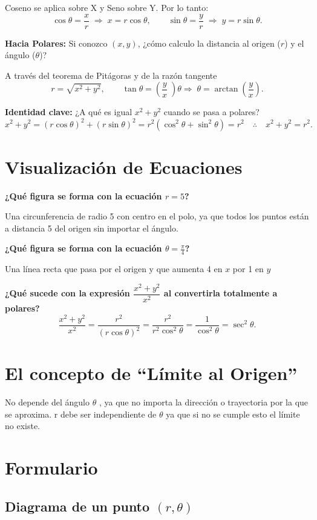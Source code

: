 \documentclass[50pt]{article}
\begin{document}
Coseno se aplica sobre X y Seno sobre Y. Por lo tanto:
\[
\cos\theta=\frac{x}{r}\;\Rightarrow\; x=r\cos\theta,
\qquad
\sin\theta=\frac{y}{r}\;\Rightarrow\; y=r\sin\theta .
\]
 
\textbf{Hacia Polares:} Si conozco $(x,y)$, ¿cómo calculo la distancia al origen ($r$) y el ángulo ($\theta$)?
 
A través del teorema de Pitágoras y de la razón tangente
\[
r=\sqrt{x^2+y^2},
\qquad
\tan\theta=(\frac{y}{x}\;) \theta \Rightarrow\;\theta=\arctan\left(\frac{y}{x}\right).
\]
 
\textbf{Identidad clave:} ¿A qué es igual $x^2+y^2$ cuando se pasa a polares?
\[
x^2+y^2=(r\cos\theta)^2+(r\sin\theta)^2=r^2(\cos^2\theta+\sin^2\theta)=r^2
\quad\therefore\quad x^2+y^2=r^2 .
\]
 

\section{Visualización de Ecuaciones}
 
\textbf{¿Qué figura se forma con la ecuación $r=5$?}
 
Una circunferencia de radio 5 con centro en el polo, ya que todos los puntos están a distancia 5 del origen sin importar el ángulo.
 
\textbf{¿Qué figura se forma con la ecuación $\theta=\frac{\pi}{4}$?}
 
Una línea recta que pasa por el origen y que aumenta 4 en $x$ por 1 en $y$ 
 
\textbf{¿Qué sucede con la expresión $\dfrac{x^2+y^2}{x^2}$ al convertirla totalmente a polares?}
\[
\frac{x^2+y^2}{x^2}=\frac{r^2}{(r\cos\theta)^2}=\frac{r^2}{r^2\cos^2\theta}=\frac{1}{\cos^2\theta}=\sec^2\theta .
\]

 

\section{El concepto de ``Límite al Origen''}
 
No depende del ángulo $\theta$ , ya que no importa la dirección o trayectoria por la que se aproxima. r debe ser independiente de $\theta$ ya que si no se cumple esto el límite no existe.
 

\newpage
\section{Formulario}
 
\subsection*{Diagrama de un punto $(r,\theta)$}
 
\end{document}
